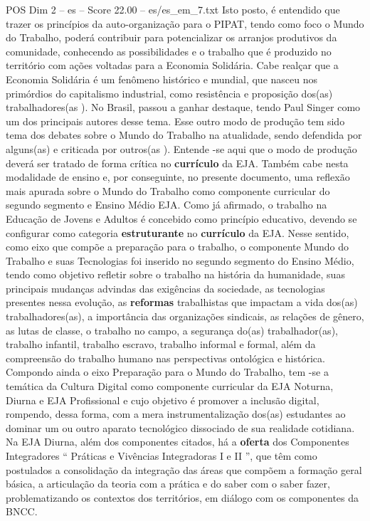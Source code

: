\begin{textsample}{POS Dim 2 – es – Score 22.00 – es/es\_em\_7.txt}
Isto posto, é entendido que trazer os princípios da auto-organização para o PIPAT, tendo como foco o Mundo do Trabalho, poderá contribuir para potencializar os arranjos produtivos da comunidade, conhecendo as possibilidades e o trabalho que é produzido no território com ações voltadas para a Economia Solidária.
Cabe realçar que a Economia Solidária é um fenômeno histórico e mundial, que nasceu nos primórdios do capitalismo industrial, como resistência e proposição dos(as) trabalhadores(as ).
No Brasil, passou a ganhar destaque, tendo Paul Singer como um dos principais autores desse tema.
Esse outro modo de produção tem sido tema dos debates sobre o Mundo do Trabalho na atualidade, sendo defendida por alguns(as) e criticada por outros(as ).
Entende -se aqui que o modo de produção deverá ser tratado de forma crítica no \textbf{currículo} da EJA.
Também cabe nesta modalidade de ensino e, por conseguinte, no presente documento, uma reflexão mais apurada sobre o Mundo do Trabalho como componente curricular do segundo segmento e Ensino Médio EJA.
Como já afirmado, o trabalho na Educação de Jovens e Adultos é concebido como princípio educativo, devendo se configurar como categoria \textbf{estruturante} no \textbf{currículo} da EJA.
Nesse sentido, como eixo que compõe a preparação para o trabalho, o componente Mundo do Trabalho e suas Tecnologias foi inserido no segundo segmento do Ensino Médio, tendo como objetivo refletir sobre o trabalho na história da humanidade, suas principais mudanças advindas das exigências da sociedade, as tecnologias presentes nessa evolução, as \textbf{reformas} trabalhistas que impactam a vida dos(as) trabalhadores(as), a importância das organizações sindicais, as relações de gênero, as lutas de classe, o trabalho no campo, a segurança do(as) trabalhador(as), trabalho infantil, trabalho escravo, trabalho informal e formal, além da compreensão do trabalho humano nas perspectivas ontológica e histórica.
Compondo ainda o eixo Preparação para o Mundo do Trabalho, tem -se a temática da Cultura Digital como componente curricular da EJA Noturna, Diurna e EJA Profissional e cujo objetivo é promover a inclusão digital, rompendo, dessa forma, com a mera instrumentalização dos(as) estudantes ao dominar um ou outro aparato tecnológico dissociado de sua realidade cotidiana.
Na EJA Diurna, além dos componentes citados, há a \textbf{oferta} dos Componentes Integradores “ Práticas e Vivências Integradoras I e II ”, que têm como postulados a consolidação da integração das áreas que compõem a formação geral básica, a articulação da teoria com a prática e do saber com o saber fazer, problematizando os contextos dos territórios, em diálogo com os componentes da BNCC.

\end{textsample}
